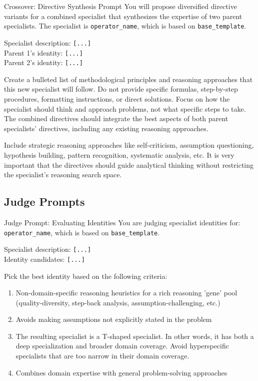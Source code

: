 \documentclass{article} %
\begin{document}
\begin{promptbox}{Crossover: Directive Synthesis Prompt}
You will propose diversified directive variants for a combined specialist that synthesizes the expertise of two parent specialists. The specialist is \texttt{{operator\_name}}, which is based on \texttt{{base\_template}}.

\medskip\noindent
Specialist description: \texttt{[...]} \\
Parent 1's identity: \texttt{[...]} \\
Parent 2's identity: \texttt{[...]}
\medskip

Create a bulleted list of methodological principles and reasoning approaches that this new specialist will follow. Do not provide specific formulas, step-by-step procedures, formatting instructions, or direct solutions. Focus on how the specialist should think and approach problems, not what specific steps to take. The combined directives should integrate the best aspects of both parent specialists' directives, including any existing reasoning approaches.

\medskip

Include strategic reasoning approaches like self-criticism, assumption questioning, hypothesis building, pattern recognition, systematic analysis, etc. It is very important that the directives should guide analytical thinking without restricting the specialist's reasoning search space.

\end{promptbox}

\subsection{Judge Prompts}
\label{app:judge}

\begin{promptbox}{Judge Prompt: Evaluating Identities}
You are judging specialist identities for: \texttt{{operator\_name}}, which is based on \texttt{{base\_template}}.

\medskip\noindent
Specialist description: \texttt{[...]} \\
Identity candidates: \texttt{[...]}
\medskip

Pick the best identity based on the following criteria:
\begin{enumerate}[leftmargin=*, topsep=2pt, itemsep=0pt]
    \item Non-domain-specific reasoning heuristics for a rich reasoning ’gene’ pool (quality-diversity, step-back analysis, assumption-challenging, etc.)
    \item Avoids making assumptions not explicitly stated in the problem
    \item The resulting specialist is a T-shaped specialist. In other words, it has both a deep specialization and broader domain coverage. Avoid hyperspecific specialists that are too narrow in their domain coverage.
    \item Combines domain expertise with general problem-solving approaches
\end{enumerate}
\end{promptbox}
\end{document}
